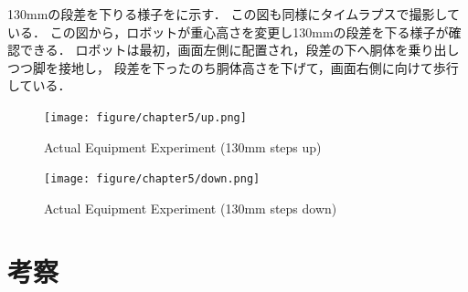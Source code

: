 130mmの段差を下りる様子をに示す．
この図も同様にタイムラプスで撮影している．
この図から，ロボットが重心高さを変更し130mmの段差を下る様子が確認できる．
ロボットは最初，画面左側に配置され，段差の下へ胴体を乗り出しつつ脚を接地し，
段差を下ったのち胴体高さを下げて，画面右側に向けて歩行している．

\begin{figure}[tb]
  \centering
  \texttt{[image: figure/chapter5/up.png]}
  \caption{Actual Equipment Experiment (130mm steps up)}
  \label{fig:ch5_experiment_1}  %
\end{figure}

\begin{figure}[tb]
  \centering
  \texttt{[image: figure/chapter5/down.png]}
  \caption{Actual Equipment Experiment (130mm steps down)}
  \label{fig:ch5_experiment_2}  %
\end{figure}

\section{考察}